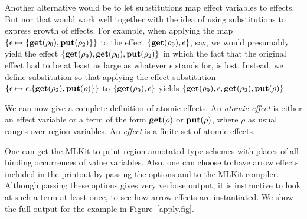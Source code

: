 \documentclass[12pt]{book}
\begin{document}
Another alternative would be to let substitutions map effect variables to
effects. But nor that would work well together with the idea of using
substitutions to express growth of effects. For example, when applying the map
$\{\epsilon\mapsto\{\mathop{\bf get}\nolimits(\rho_0),\mathop{\bf put}\nolimits(\rho_2)\}\}$ to the effect
$\{\mathop{\bf get}\nolimits(\rho_9),\epsilon\}$, say, we would presumably yield the effect
$\{\mathop{\bf get}\nolimits(\rho_9),\mathop{\bf get}\nolimits(\rho_0),\mathop{\bf put}\nolimits(\rho_2)\}$ in which the fact that the original
effect had to be at least as large as whatever $\epsilon$ stands for, is lost.
Instead, we define substitution so that applying the effect substitution
$\{\epsilon\mapsto\epsilon.\{\mathop{\bf get}\nolimits(\rho_2),\mathop{\bf put}\nolimits(\rho)\}\}$ to
$\{\mathop{\bf get}\nolimits(\rho_9),\epsilon\}$ yields
$\{\mathop{\bf get}\nolimits(\rho_9),\epsilon,\mathop{\bf get}\nolimits(\rho_2),\mathop{\bf put}\nolimits(\rho)\}$.

We can now give a complete definition of atomic effects.  An
%
%
%
{\em atomic effect\/} is either an effect variable or a term of the form
$\mathop{\bf get}\nolimits(\rho)$ or $\mathop{\bf put}\nolimits(\rho)$, where $\rho$ as usual ranges over region
variables. An
%
%
%
{\em effect\/} is a finite set of atomic effects.

One can get the MLKit to print region-annotated
%
%
%
%
type schemes with places of all binding occurrences of value variables.  Also,
one can choose to have arrow effects included in the printout by passing the
options  and  to the MLKit
compiler. Although passing these options gives very verbose output, it is
instructive to look at such a term at least once, to see how arrow effects are
instantiated. We show the full output for the  example in
Figure~\ref{apply.fig}.
\end{document}
